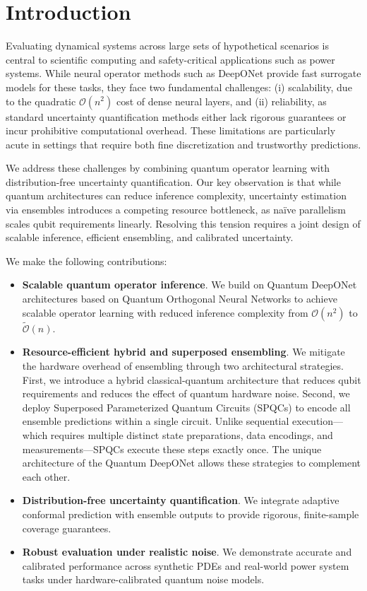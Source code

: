\documentclass{iopjournal}
\begin{document}
\section{Introduction}
Evaluating dynamical systems across large sets of hypothetical scenarios is central to scientific computing and safety-critical applications such as power systems. While neural operator methods such as DeepONet provide fast surrogate models for these tasks, they face two fundamental challenges: (i) scalability, due to the quadratic $\mathcal{O}(n^2)$ cost of dense neural layers, and (ii) reliability, as standard uncertainty quantification methods either lack rigorous guarantees or incur prohibitive computational overhead. These limitations are particularly acute in settings that require both fine discretization and trustworthy predictions.

We address these challenges by combining quantum operator learning with distribution-free uncertainty quantification. Our key observation is that while quantum architectures can reduce inference complexity, uncertainty estimation via ensembles introduces a competing resource bottleneck, as naïve parallelism scales qubit requirements linearly. Resolving this tension requires a joint design of scalable inference, efficient ensembling, and calibrated uncertainty.

We make the following contributions:
\begin{itemize}
\item \textbf{Scalable quantum operator inference}. We build on Quantum DeepONet architectures based on Quantum Orthogonal Neural Networks to achieve scalable operator learning with reduced inference complexity from $\mathcal{O}(n^2)$ to $\tilde{\mathcal{O}}(n)$.
\item \textbf{Resource-efficient hybrid and superposed ensembling}. We mitigate the hardware overhead of ensembling through two architectural strategies. First, we introduce a hybrid classical-quantum architecture that reduces qubit requirements and reduces the effect of quantum hardware noise. Second, we deploy Superposed Parameterized Quantum Circuits (SPQCs) to encode all ensemble predictions within a single circuit. Unlike sequential execution—which requires multiple distinct state preparations, data encodings, and measurements—SPQCs execute these steps exactly once. The unique architecture of the Quantum DeepONet allows these strategies to complement each other.
\item \textbf{Distribution-free uncertainty quantification}. We integrate adaptive conformal prediction with ensemble outputs to provide rigorous, finite-sample coverage guarantees.
\item \textbf{Robust evaluation under realistic noise}. We demonstrate accurate and calibrated performance across synthetic PDEs and real-world power system tasks under hardware-calibrated quantum noise models.
\end{itemize}
\end{document}
